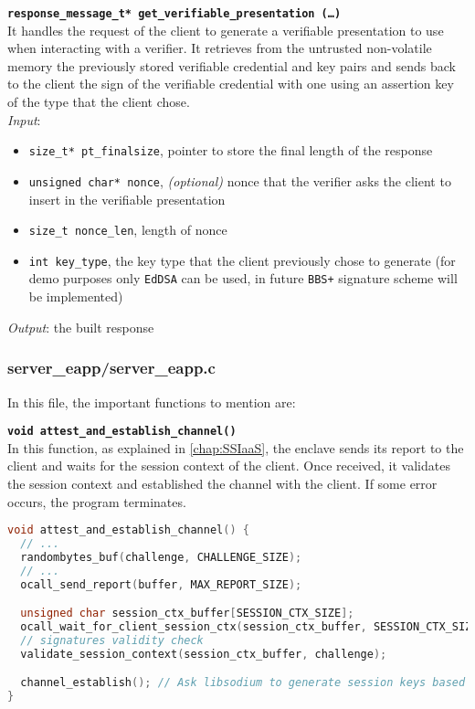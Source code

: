 \noindent
\texttt{\bfseries response\_message\_t* get\_verifiable\_presentation (\dots)}\\
It handles the request of the client to generate a verifiable presentation to use when interacting with a verifier. It retrieves from the untrusted non-volatile memory the previously stored verifiable credential and key pairs and sends back to the client the sign of the verifiable credential with one using an assertion key of the type that the client chose. \\
\textit{Input}:
\begin{itemize}[noitemsep,nolistsep]
  \item \texttt{size\_t* pt\_finalsize}, pointer to store the final length of the response
  \item \texttt{unsigned char* nonce}, \textit{(optional)} nonce that the verifier asks the client to insert in the verifiable presentation  
  \item \texttt{size\_t nonce\_len}, length of nonce
  \item \texttt{int key\_type}, the key type that the client previously chose to generate (for demo purposes only \texttt{EdDSA} can be used, in future \texttt{BBS+} signature scheme will be implemented)
\end{itemize}
\textit{Output}: the built response 



\subsubsection{server\_eapp/server\_eapp.c}
In this file, the important functions to mention are:

\noindent
\texttt{\bfseries void attest\_and\_establish\_channel()}\\
In this function, as explained in \autoref{chap:SSIaaS}, the enclave sends its report to the client and waits for the session context of the client. Once received, it validates the session context and established the channel with the client. If some error occurs, the program terminates. 

\begin{lstlisting}[language=C,frame=single]
void attest_and_establish_channel() {
  // ...  
  randombytes_buf(challenge, CHALLENGE_SIZE);
  // ...  
  ocall_send_report(buffer, MAX_REPORT_SIZE);

  unsigned char session_ctx_buffer[SESSION_CTX_SIZE];
  ocall_wait_for_client_session_ctx(session_ctx_buffer, SESSION_CTX_SIZE);
  // signatures validity check
  validate_session_context(session_ctx_buffer, challenge); 

  channel_establish(); // Ask libsodium to generate session keys based on the received pk
} 
\end{lstlisting}
\leavevmode\newline

